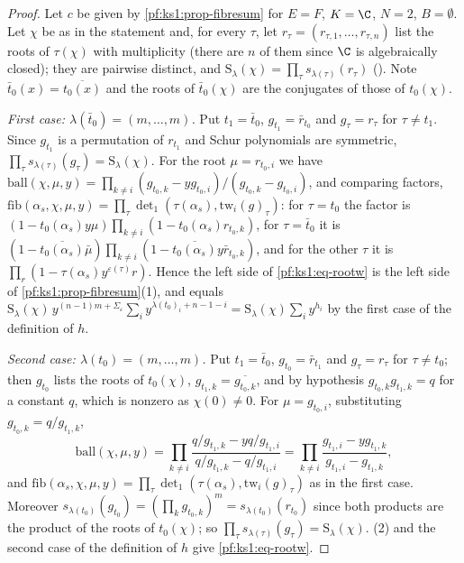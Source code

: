 \begin{proof}
Let $c$ be given by \cref{pf:ks1:prop-fibresum} for $E=F$, $K=\C$, $N=2$, $B=\emptyset$. Let $\chi$ be as in the statement and, for every $\tau$, let
$r_\tau=(r_{\tau,1},\dots,r_{\tau,n})$ list the roots of $\tau(\chi)$ with multiplicity (there are $n$ of them since $\C$ is
algebraically closed); they are pairwise distinct, and $\mathrm{S}_\lambda(\chi)=\prod_\tau s_{\lambda(\tau)}(r_\tau)$ ().
Note $\bar t_0(x)=\overline{t_0(x)}$ and the roots of $\bar t_0(\chi)$ are the conjugates of those of $t_0(\chi)$.

\emph{First case: $\lambda(\bar t_0)=(m,\dots,m)$.} Put $t_1=\bar t_0$, $g_{t_1}=\bar r_{t_0}$
and $g_\tau=r_\tau$ for $\tau\neq t_1$. Since $g_{t_1}$ is a permutation of $r_{t_1}$ and Schur polynomials are symmetric,
$\prod_\tau s_{\lambda(\tau)}(g_\tau)=\mathrm{S}_\lambda(\chi)$. For the root $\mu=r_{t_0,i}$ we have
$\mathrm{ball}(\chi,\mu,y)=\prod_{k\neq i}(g_{t_0,k}-yg_{t_0,i})/(g_{t_0,k}-g_{t_0,i})$, and comparing factors,
$\mathrm{fib}(\alpha_s,\chi,\mu,y)=\prod_\tau\det_1(\tau(\alpha_s),\mathrm{tw}_i(g)_\tau)$: for $\tau=t_0$ the factor is
$(1-t_0(\alpha_s)y\mu)\prod_{k\neq i}(1-t_0(\alpha_s)r_{t_0,k})$, for $\tau=\bar t_0$ it is
$(1-\overline{t_0(\alpha_s)}\bar\mu)\prod_{k\neq i}(1-\overline{t_0(\alpha_s)}y\bar r_{t_0,k})$, and for the other $\tau$ it is
$\prod_r(1-\tau(\alpha_s)y^{\varepsilon(\tau)}r)$. Hence the left side of \eqref{pf:ks1:eq-rootw} is the left side of
\cref{pf:ks1:prop-fibresum}(1), and equals $\mathrm{S}_\lambda(\chi)\,y^{(n-1)m+\Sigma_\varepsilon}\sum_iy^{\lambda(t_0)_i+n-1-i}=
\mathrm{S}_\lambda(\chi)\sum_iy^{h_i}$ by the first case of the definition of $h$.

\emph{Second case: $\lambda(t_0)=(m,\dots,m)$.} Put $t_1=\bar t_0$, $g_{t_0}=\bar r_{t_1}$ and
$g_\tau=r_\tau$ for $\tau\neq t_0$; then $g_{t_0}$ lists the roots of $t_0(\chi)$, $g_{t_1,k}=\overline{g_{t_0,k}}$, and by hypothesis
$g_{t_0,k}g_{t_1,k}=q$ for a constant $q$, which is nonzero as $\chi(0)\neq0$. For $\mu=g_{t_0,i}$, substituting $g_{t_0,k}=q/g_{t_1,k}$,
\[\mathrm{ball}(\chi,\mu,y)=\prod_{k\neq i}\frac{q/g_{t_1,k}-yq/g_{t_1,i}}{q/g_{t_1,k}-q/g_{t_1,i}}=\prod_{k\neq i}\frac{g_{t_1,i}-yg_{t_1,k}}{g_{t_1,i}-g_{t_1,k}},\]
and $\mathrm{fib}(\alpha_s,\chi,\mu,y)=\prod_\tau\det_1(\tau(\alpha_s),\mathrm{tw}_i(g)_\tau)$ as in the
first case. Moreover $s_{\lambda(t_0)}(g_{t_0})=(\prod_kg_{t_0,k})^m=s_{\lambda(t_0)}(r_{t_0})$ since both products are the product of the roots of
$t_0(\chi)$; so $\prod_\tau s_{\lambda(\tau)}(g_\tau)=\mathrm{S}_\lambda(\chi)$. (2) and the second case of the definition of
$h$ give \eqref{pf:ks1:eq-rootw}.
\end{proof}

